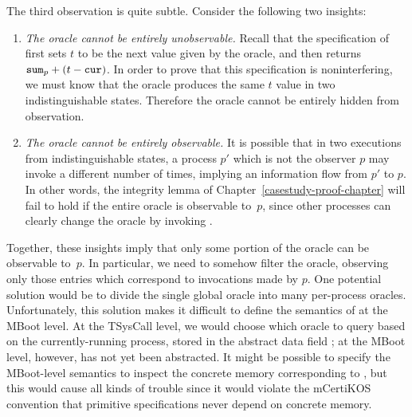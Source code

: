 The third observation is quite subtle. Consider the following 
two insights:
\begin{enumerate}
\item \emph{The oracle cannot be entirely unobservable.}
Recall that the specification of \gett{} first
sets $t$ to be the next value given by the oracle, and then 
returns $\text{\tt{sum}}_p + (t - \text{\tt{cur}})$. 
In order to prove that this specification is noninterfering,
we must know that the oracle produces the same $t$ value
in two indistinguishable states. Therefore the oracle cannot
be entirely hidden from observation.
\item \emph{The oracle cannot be entirely observable.} 
It is possible that in two executions
from indistinguishable states, a process $p'$ which is not the 
observer $p$ may invoke \gett{} a different number of times, implying
an information flow from $p'$ to $p$. In other words, the 
integrity lemma of Chapter~\ref{casestudy-proof-chapter} will
fail to hold if the entire oracle is observable to~$p$,
since other processes can clearly change the oracle by invoking
\gett{}.
\end{enumerate}
Together, these insights imply that only some portion of the
oracle can be observable to~$p$. In particular, we need to
somehow filter the oracle, observing only those entries
which correspond to  invocations made by $p$.
One potential solution would be to divide the single global
oracle into many per-process oracles. Unfortunately, this
solution makes it difficult to define the semantics of
 at the MBoot level. At the TSysCall level, we
would choose which oracle to query based on the currently-running
process, stored in the abstract data field ; at the
MBoot level, however,  has not yet been abstracted.
It might be possible to specify the MBoot-level semantics to
inspect the concrete memory corresponding to , but this
would cause all kinds of trouble since it would violate the mCertiKOS 
convention that primitive specifications never depend on concrete 
memory.

